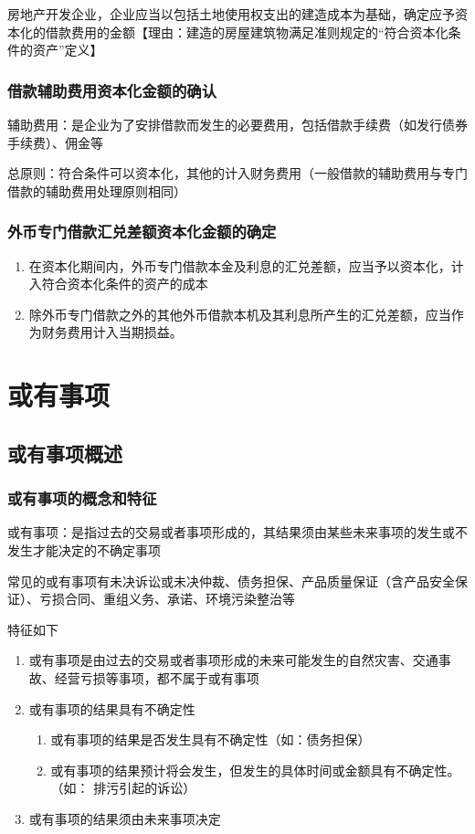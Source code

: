 \documentclass[UTF8,12pt]{ctexart}
\numberwithin{equation}{section} %
\numberwithin{figure}{section}
\numberwithin{table}{section}
\begin{document}
	房地产开发企业，企业应当以包括土地使用权支出的建造成本为基础，确定应予资本化的借款费用的金额【理由：建造的房屋建筑物满足准则规定的“符合资本化条件的资产”定义】
	
	\subsubsection{借款辅助费用资本化金额的确认}
	
	辅助费用：是企业为了安排借款而发生的必要费用，包括借款手续费（如发行债券手续费）、佣金等
	
	总原则：符合条件可以资本化，其他的计入财务费用（一般借款的辅助费用与专门借款的辅助费用处理原则相同）
	
	\subsubsection{外币专门借款汇兑差额资本化金额的确定}
	
	\begin{enumerate}
		\item 在资本化期间内，外币专门借款本金及利息的汇兑差额，应当予以资本化，计入符合资本化条件的资产的成本
		
		\item 除外币专门借款之外的其他外币借款本机及其利息所产生的汇兑差额，应当作为财务费用计入当期损益。
	\end{enumerate}
	
	\newpage
	\section{或有事项}
	\subsection{或有事项概述}
	\subsubsection{或有事项的概念和特征}
	或有事项：是指过去的交易或者事项形成的，其结果须由某些未来事项的发生或不发生才能决定的不确定事项
	
	常见的或有事项有未决诉讼或未决仲裁、债务担保、产品质量保证（含产品安全保证）、亏损合同、重组义务、承诺、环境污染整治等
	
	特征如下
	\begin{enumerate}
		\item 或有事项是由过去的交易或者事项形成的未来可能发生的自然灾害、交通事故、经营亏损等事项，都不属于或有事项
		
		\item 或有事项的结果具有不确定性
		\begin{enumerate}
			\item 或有事项的结果是否发生具有不确定性（如：债务担保）
			
			\item 或有事项的结果预计将会发生，但发生的具体时间或金额具有不确定性。（如：  排污引起的诉讼）
		\end{enumerate}
		
		\item 或有事项的结果须由未来事项决定
	\end{enumerate}
\end{document}
